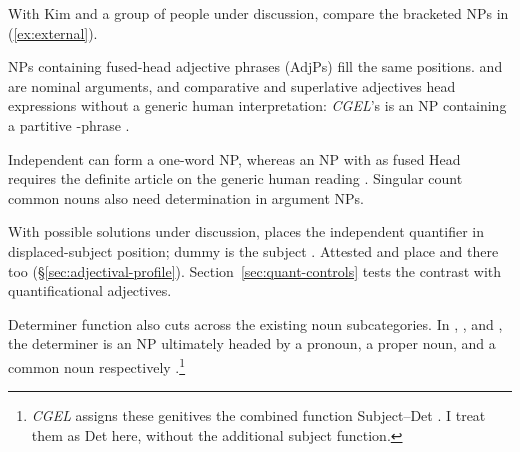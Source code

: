 \documentclass[12pt]{article}
\begin{document}
With Kim and a group of people under discussion, compare the bracketed NPs in (\ref{ex:external}).

\begin{samepage}

\ea\label{ex:external}
\ea {}\qquad {}\qquad {}
\ex {}\qquad {}\qquad {}
\ex {}\qquad {}\qquad {}
\ex {}\qquad {}\qquad {}
\z\z

\end{samepage}

NPs containing fused-head adjective phrases (AdjPs) fill the same positions.  and  are nominal arguments, and comparative and superlative adjectives head expressions without a generic human interpretation: \textit{CGEL}'s  is an NP containing a partitive -phrase \citep[332--333, 416--423]{huddleston2002}.

Independent  can form a one-word NP, whereas an NP with  as fused Head requires the definite article  on the generic human reading \citep[417--418]{huddleston2002}. Singular count common nouns also need determination in argument NPs.

With possible solutions under discussion,  places the independent quantifier in displaced-subject position; dummy  is the subject \citep[1391--1393]{huddleston2002}. Attested  and  place  and  there too (§\ref{sec:adjectival-profile}). Section~\ref{sec:quant-controls} tests the contrast with quantificational adjectives.

Determiner function also cuts across the existing noun subcategories. In , , and , the determiner is an NP ultimately headed by a pronoun, a proper noun, and a common noun respectively \citep[354--355, 470--471]{huddleston2002}.\footnote{\textit{CGEL} assigns these genitives the combined function Subject--Det \citep[472--473]{huddleston2002}. I treat them as Det here, without the additional subject function.}
\end{document}
